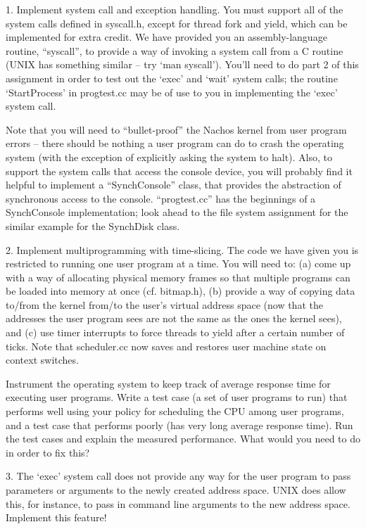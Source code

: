 \begin{description}
\item{1.}
Implement system call and exception handling.  You must
support all of the system calls defined in syscall.h, except
for thread fork and yield, which can be implemented for extra credit.
We have provided you an assembly-language routine, ``syscall'', to
provide a way of invoking a system call from a C routine (UNIX has
something similar -- try `man syscall').   You'll need to do part 2 of 
this assignment in order to test out the `exec' and `wait' system calls;
the routine `StartProcess' in progtest.cc may be of use to you in
implementing the `exec' system call.

Note that you will need to ``bullet-proof'' the Nachos kernel from
user program errors -- there should be nothing a user program can
do to crash the operating system (with the exception of explicitly asking 
the system to halt).  Also, to support the system calls that access 
the console device, you will probably find it helpful to implement 
a ``SynchConsole'' class, that provides the abstraction of
synchronous access to the console.  ``progtest.cc'' has the beginnings 
of a SynchConsole implementation; look ahead to the file system assignment for
the similar example for the SynchDisk class.

\item{2.}
Implement multiprogramming with time-slicing.  The code we have given
you is restricted to running one user program at a time.
You will need to: (a) come up with a way of allocating physical memory 
frames so that multiple programs can be loaded into memory at once 
(cf. bitmap.h), (b) provide a way of copying data to/from the kernel 
from/to the user's 
virtual address space (now that the addresses the user program sees
are not the same as the ones the kernel sees), and (c) use timer interrupts 
to force threads to yield after a certain number of ticks.
Note that scheduler.cc now saves and restores user machine state
on context switches.

Instrument the operating system to keep track of average response time
for executing user programs.
Write a test case (a set of user programs to run) that performs well 
using your policy for scheduling the CPU among user programs, and a 
test case that performs poorly (has very long average response time).
Run the test cases and explain the measured performance. 
What would you need to do in order to fix this?

\item{3.} The `exec' system call does not provide any way for the 
user program to pass parameters or arguments to the newly created 
address space.  UNIX does allow this, for instance, to pass in command
line arguments to the new address space.  Implement this feature!


\end{description}
